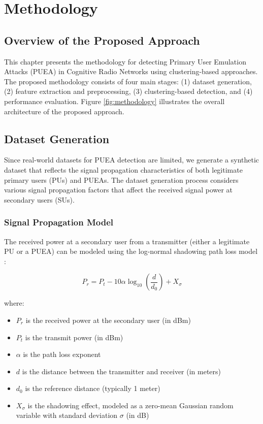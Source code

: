 \chapter{Methodology}

\section{Overview of the Proposed Approach}
This chapter presents the methodology for detecting Primary User Emulation Attacks (PUEA) in Cognitive Radio Networks using clustering-based approaches. The proposed methodology consists of four main stages: (1) dataset generation, (2) feature extraction and preprocessing, (3) clustering-based detection, and (4) performance evaluation. Figure \ref{fig:methodology} illustrates the overall architecture of the proposed approach.


\section{Dataset Generation}
Since real-world datasets for PUEA detection are limited, we generate a synthetic dataset that reflects the signal propagation characteristics of both legitimate primary users (PUs) and PUEAs. The dataset generation process considers various signal propagation factors that affect the received signal power at secondary users (SUs).

\subsection{Signal Propagation Model}
The received power at a secondary user from a transmitter (either a legitimate PU or a PUEA) can be modeled using the log-normal shadowing path loss model \cite{rappaport1996wireless}:

\begin{equation}
P_r = P_t - 10 \alpha \log_{10}\left(\frac{d}{d_0}\right) + X_\sigma
\end{equation}

where:
\begin{itemize}
    \item $P_r$ is the received power at the secondary user (in dBm)
    \item $P_t$ is the transmit power (in dBm)
    \item $\alpha$ is the path loss exponent
    \item $d$ is the distance between the transmitter and receiver (in meters)
    \item $d_0$ is the reference distance (typically 1 meter)
    \item $X_\sigma$ is the shadowing effect, modeled as a zero-mean Gaussian random variable with standard deviation $\sigma$ (in dB)
\end{itemize}

